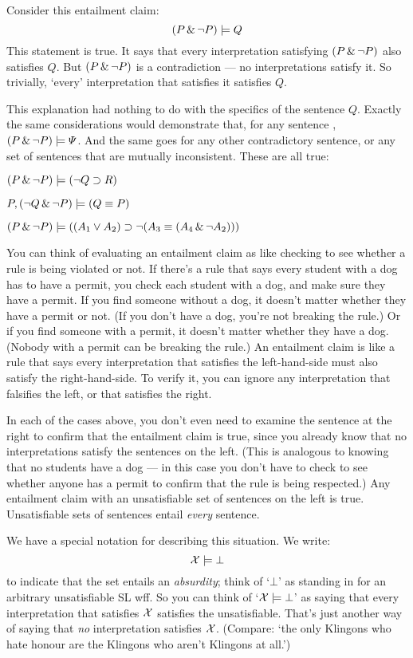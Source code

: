 Consider this entailment claim: $$(P \,\&\, \neg P) \models Q$$This statement is true. It says that every interpretation satisfying $(P \,\&\, \neg P)$ also satisfies $Q$. But $(P \,\&\, \neg P)$ is a contradiction --- no interpretations satisfy it. So trivially, `every' interpretation that satisfies it satisfies $Q$.

This explanation had nothing to do with the specifics of the sentence $Q$. Exactly the same considerations would demonstrate that, for any sentence \metaB{}, $(P \,\&\, \neg P) \models \varPsi{}$. And the same goes for any other contradictory sentence, or any set of sentences that are mutually inconsistent. These are all true:

\begin{earg}
\item[] $(P \,\&\, \neg P) \models (\neg Q \supset R)$
\item[] $P, (\neg Q \,\&\, \neg P) \models (Q \equiv P)$
\item[] $(P \,\&\,\neg P) \models ((A_1 \vee A_2) \supset \neg (A_3 \equiv (A_4 \,\&\, \neg A_2)))$
\end{earg}

You can think of evaluating an entailment claim as like checking to see whether a rule is being violated or not. If there's a rule that says every student with a dog has to have a permit, you check each student with a dog, and make sure they have a permit. If you find someone without a dog, it doesn't matter whether they have a permit or not. (If you don't have a dog, you're not breaking the rule.) Or if you find someone with a permit, it doesn't matter whether they have a dog. (Nobody with a permit can be breaking the rule.) An entailment claim is like a rule that says every interpretation that satisfies the left-hand-side must also satisfy the right-hand-side. To verify it, you can ignore any interpretation that falsifies the left, or that satisfies the right.

In each of the cases above, you don't even need to examine the sentence at the right to confirm that the entailment claim is true, since you already know that no interpretations satisfy the sentences on the left. (This is analogous to knowing that no students have a dog --- in this case you don't have to check to see whether anyone has a permit to confirm that the rule is being respected.) Any entailment claim with an unsatisfiable set of sentences on the left is true. Unsatisfiable sets of sentences entail \emph{every} sentence.

We have a special notation for describing this situation. We write: $$\mathcal{X}{} \models \bot$$ to indicate that the set \metaSetX{} entails an \emph{absurdity}; think of `$\bot$' as standing in for an arbitrary unsatisfiable SL wff. So you can think of `$\mathcal{X}{} \models \bot$' as saying that every interpretation that satisfies $\mathcal{X}{}$ satisfies the unsatisfiable. That's just another way of saying that \emph{no} interpretation satisfies $\mathcal{X}{}$. (Compare: `the only Klingons who hate honour are the Klingons who aren't Klingons at all.')

